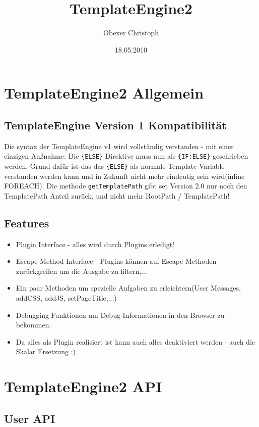 \documentclass[a4paper,10pt]{article}
\title{TemplateEngine2}
\author{Obexer Christoph}
\date{18.05.2010}
\begin{document}
\maketitle
\pagebreak

\tableofcontents
\pagebreak

\section{TemplateEngine2 Allgemein}

\subsection{TemplateEngine Version 1 Kompatibilit\"at}
Die syntax der TemplateEngine v1 wird vollst\"andig verstanden - mit einer einzigen Au\ss{}nahme:\newline
Die {\tt \{ELSE\}} Direktive muss nun als {\tt \{IF:ELSE\}} geschrieben werden, Grund daf\"ur ist
das das {\tt \{ELSE\}} als normale Template Variable verstanden werden kann und in Zukunft nicht mehr
eindeutig sein wird(inline FOREACH).\newline
Die methode {\tt getTemplatePath} gibt set Version 2.0 nur noch den TemplatePath Anteil zur\"uck, und nicht mehr
RootPath / TemplatePath!

\subsection{Features}
\begin{itemize}
	\item Plugin Interface - alles wird durch Plugins erledigt!
	\item Escape Method Interface - Plugins k\"onnen auf Escape Methoden zur\"uckgreifen um die Ausgabe zu filtern,...
	\item Ein paar Methoden um spezielle Aufgaben zu erleichtern(User Messages, addCSS, addJS, setPageTitle,...)
	\item Debugging Funktionen um Debug-Informationen in den Browser zu bekommen.
	\item Da alles als Plugin realisiert ist kann auch alles deaktiviert werden - auch die Skalar Ersetzung :)
\end{itemize}


\section{TemplateEngine2 API}

\subsection{User API}
\end{document}
